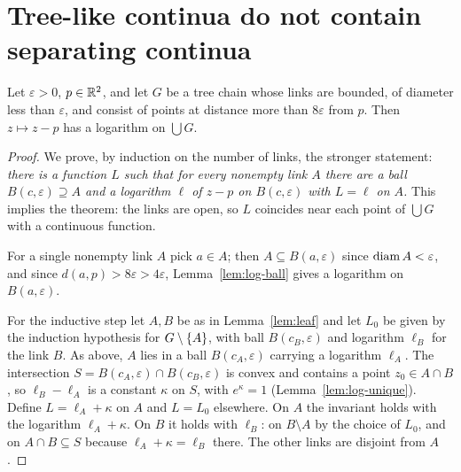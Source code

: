 
\section{Tree-like continua do not contain separating continua}

\begin{theorem}\label{thm:log-treechain}
Let $\varepsilon>0$, $p\in\mathbb{R}^2$, and let $G$ be a tree chain whose links are bounded, of diameter
less than $\varepsilon$, and consist of points at distance more than $8\varepsilon$ from $p$. Then
$z\mapsto z-p$ has a logarithm on $\bigcup G$.
\end{theorem}

\begin{proof}
We prove, by induction on the number of links, the stronger statement: \emph{there is a function $L$
such that for every nonempty link $A$ there are a ball $B(c,\varepsilon)\supseteq A$ and a logarithm
$\ell$ of $z-p$ on $B(c,\varepsilon)$ with $L=\ell$ on $A$.} This implies the theorem: the links are
open, so $L$ coincides near each point of $\bigcup G$ with a continuous function.

For a single nonempty link $A$ pick $a\in A$; then $A\subseteq B(a,\varepsilon)$ since $\operatorname{diam}
A<\varepsilon$, and since $d(a,p)>8\varepsilon>4\varepsilon$, Lemma~\ref{lem:log-ball} gives a
logarithm on $B(a,\varepsilon)$.

For the inductive step let $A,B$ be as in Lemma~\ref{lem:leaf} and let $L_0$ be given by the induction
hypothesis for $G\setminus\left\{ A \right\}$, with ball $B(c_B,\varepsilon)$ and logarithm $\ell_B$ for the link
$B$. As above, $A$ lies in a ball $B(c_A,\varepsilon)$ carrying a logarithm $\ell_A$. The intersection
$S=B(c_A,\varepsilon)\cap B(c_B,\varepsilon)$ is convex and contains a point $z_0\in A\cap B$, so
$\ell_B-\ell_A$ is a constant $\kappa$ on $S$, with $e^\kappa=1$ (Lemma~\ref{lem:log-unique}). Define
$L=\ell_A+\kappa$ on $A$ and $L=L_0$ elsewhere. On $A$ the invariant holds with the logarithm
$\ell_A+\kappa$. On $B$ it holds with $\ell_B$: on $B\setminus A$ by the choice of $L_0$, and on
$A\cap B\subseteq S$ because $\ell_A+\kappa=\ell_B$ there. The other links are disjoint from $A$.
\end{proof}

